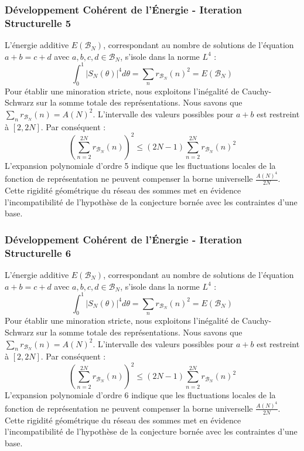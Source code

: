 \documentclass[11pt,a4paper]{article}
\begin{document}
\subsubsection{Développement Cohérent de l'Énergie - Iteration Structurelle 5}
L'énergie additive $E(\mathcal{B}_N)$, correspondant au nombre de solutions de l'équation $a+b = c+d$ avec $a,b,c,d \in \mathcal{B}_N$, s'isole dans la norme $L^4$ :
$$ \int_{0}^{1} |S_N(\theta)|^4 d\theta = \sum_{n} r_{\mathcal{B}_N}(n)^2 = E(\mathcal{B}_N) $$
Pour établir une minoration stricte, nous exploitons l'inégalité de Cauchy-Schwarz sur la somme totale des représentations. Nous savons que $\sum_{n} r_{\mathcal{B}_N}(n) = A(N)^2$. L'intervalle des valeurs possibles pour $a+b$ est restreint à $[2, 2N]$.
Par conséquent :
$$ \left( \sum_{n=2}^{2N} r_{\mathcal{B}_N}(n) \right)^2 \leq (2N - 1) \sum_{n=2}^{2N} r_{\mathcal{B}_N}(n)^2 $$
L'expansion polynomiale d'ordre 5 indique que les fluctuations locales de la fonction de représentation ne peuvent compenser la borne universelle $\frac{A(N)^4}{2N}$. Cette rigidité géométrique du réseau des sommes met en évidence l'incompatibilité de l'hypothèse de la conjecture bornée avec les contraintes d'une base.
\subsubsection{Développement Cohérent de l'Énergie - Iteration Structurelle 6}
L'énergie additive $E(\mathcal{B}_N)$, correspondant au nombre de solutions de l'équation $a+b = c+d$ avec $a,b,c,d \in \mathcal{B}_N$, s'isole dans la norme $L^4$ :
$$ \int_{0}^{1} |S_N(\theta)|^4 d\theta = \sum_{n} r_{\mathcal{B}_N}(n)^2 = E(\mathcal{B}_N) $$
Pour établir une minoration stricte, nous exploitons l'inégalité de Cauchy-Schwarz sur la somme totale des représentations. Nous savons que $\sum_{n} r_{\mathcal{B}_N}(n) = A(N)^2$. L'intervalle des valeurs possibles pour $a+b$ est restreint à $[2, 2N]$.
Par conséquent :
$$ \left( \sum_{n=2}^{2N} r_{\mathcal{B}_N}(n) \right)^2 \leq (2N - 1) \sum_{n=2}^{2N} r_{\mathcal{B}_N}(n)^2 $$
L'expansion polynomiale d'ordre 6 indique que les fluctuations locales de la fonction de représentation ne peuvent compenser la borne universelle $\frac{A(N)^4}{2N}$. Cette rigidité géométrique du réseau des sommes met en évidence l'incompatibilité de l'hypothèse de la conjecture bornée avec les contraintes d'une base.
\end{document}
